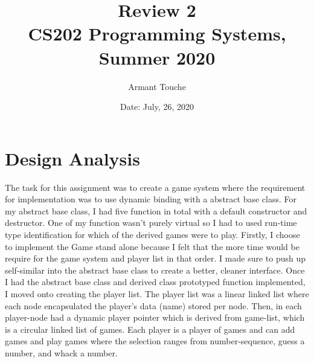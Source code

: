 \documentclass[11pt, a4paper]{article}
\title{\bf Review 2\\[1ex]
\rm\normalsize CS202 Programming Systems, Summer 2020 }
\date{\normalsize Date: July, 26, 2020}
\author{\normalsize Armant Touche}
\begin{document}
\vspace{0cm}\maketitle 

\section*{Design Analysis}
The task for this assignment was to create a game system where the requirement for implementation was to use dynamic binding with a abstract base class. For my abstract base class, I had five function in total with a default constructor and destructor. One of my function wasn't purely virtual so I had to used run-time type identification for which of the derived games were to play. Firstly, I choose to implement the Game stand alone because I felt that the more time would be require for the game system and player list in that order. I made sure to push up self-similar into the abstract base class to create a better, cleaner interface. Once I had the abstract base class and derived class prototyped function implemented, I moved onto creating the player list. The player list was a linear linked list where each node encapsulated the player's data (name) stored per node. Then, in each player-node had a dynamic player pointer which is derived from game-list, which is a circular linked list of games. Each player is a player of games and can add games and play games where the selection ranges from number-sequence, guess a number, and whack a number.\\
\end{document}
